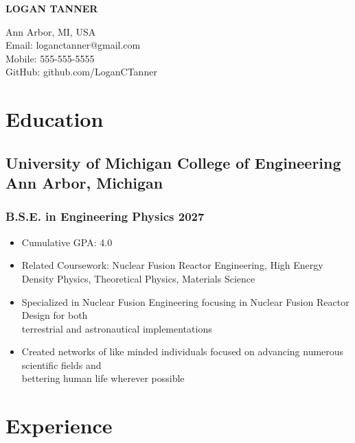 \documentclass[10pt]{article} %
\begin{document}
\begin{center}
    \begin{minipage}{0.5\textwidth}
        {\huge\bfseries
            LOGAN TANNER 
        } \\ \medskip
    \end{minipage} \hfill
    \begin{minipage}{0.4\textwidth}
        \raggedleft
        Ann Arbor, MI, USA\\
        Email: loganctanner@gmail.com\\
        Mobile: 555-555-5555\\
        GitHub: github.com/LoganCTanner
    \end{minipage}
\end{center}

\section{Education}
\subsection{University of Michigan College of Engineering \hfill Ann Arbor, Michigan}
\subsubsection{B.S.E. in Engineering Physics \hfill 2027}
\begin{itemize}
    \item {Cumulative GPA: 4.0}
    \item {Related Coursework: Nuclear Fusion Reactor Engineering, 
        High Energy Density Physics, Theoretical Physics, Materials Science} 
    \item {Specialized in Nuclear Fusion Engineering focusing in Nuclear 
        Fusion Reactor Design for both  \\ terrestrial and astronautical implementations}
    \item {Created networks of like minded individuals focused on advancing
        numerous scientific fields and \\ bettering human life wherever possible}
    
\end{itemize}

\section{Experience}
\end{document}
